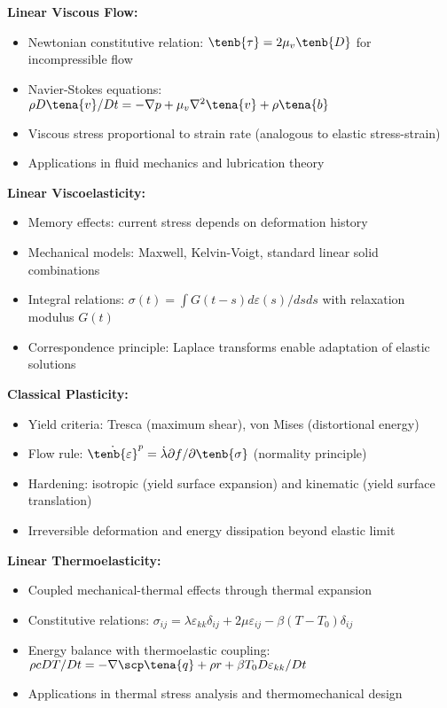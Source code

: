 \begin{subox}[Summary]
\textbf{Linear Viscous Flow:}
\begin{itemize}
\item Newtonian constitutive relation: $\tenb{\tau} = 2\mu_v \tenb{D}$ for incompressible flow
\item Navier-Stokes equations: $\rho D\tena{v}/Dt = -\nabla p + \mu_v \nabla^2 \tena{v} + \rho \tena{b}$
\item Viscous stress proportional to strain rate (analogous to elastic stress-strain)
\item Applications in fluid mechanics and lubrication theory
\end{itemize}

\textbf{Linear Viscoelasticity:}
\begin{itemize}
\item Memory effects: current stress depends on deformation history
\item Mechanical models: Maxwell, Kelvin-Voigt, standard linear solid combinations
\item Integral relations: $\sigma(t) = \int G(t-s) d\varepsilon(s)/ds ds$ with relaxation modulus $G(t)$
\item Correspondence principle: Laplace transforms enable adaptation of elastic solutions
\end{itemize}

\textbf{Classical Plasticity:}
\begin{itemize}
\item Yield criteria: Tresca (maximum shear), von Mises (distortional energy)
\item Flow rule: $\dot{\tenb{\varepsilon}}^p = \dot{\lambda} \partial f/\partial \tenb{\sigma}$ (normality principle)
\item Hardening: isotropic (yield surface expansion) and kinematic (yield surface translation)
\item Irreversible deformation and energy dissipation beyond elastic limit
\end{itemize}

\textbf{Linear Thermoelasticity:}
\begin{itemize}
\item Coupled mechanical-thermal effects through thermal expansion
\item Constitutive relations: $\sigma_{ij} = \lambda \varepsilon_{kk} \delta_{ij} + 2\mu \varepsilon_{ij} - \beta (T - T_0) \delta_{ij}$
\item Energy balance with thermoelastic coupling: $\rho c DT/Dt = -\nabla \scp \tena{q} + \rho r + \beta T_0 D\varepsilon_{kk}/Dt$
\item Applications in thermal stress analysis and thermomechanical design
\end{itemize}


\end{subox}
